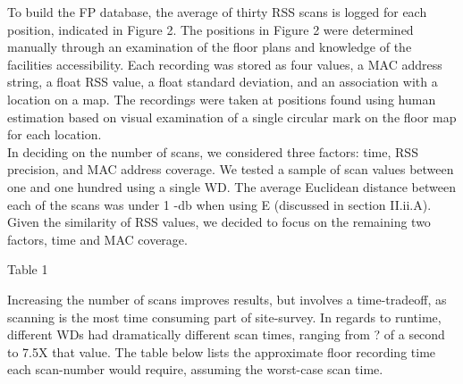 \documentclass[twoside]{article}
\begin{document}
\begin{multicols}{2}
     
\indent To build the FP database, the average of thirty RSS scans is logged for each position, indicated in Figure 2. The positions in Figure 2 were determined manually through an examination of the floor plans and knowledge of the facilities accessibility. Each recording was stored as four values, a MAC address string, a float RSS value, a float standard deviation, and an association with a location on a map. The recordings were taken at positions found using human estimation based on visual examination of a single circular mark on the floor map for each location.\\
\indent In deciding on the number of scans, we considered three factors: time, RSS precision, and MAC address coverage. We tested a sample of scan values between one and one hundred using a single WD. The average Euclidean distance between each of the scans was under 1 -db when using E (discussed in section II.ii.A). Given the similarity of RSS values, we decided to focus on the remaining two factors, time and MAC coverage. 

\vspace{5mm}
\begin{center}
Table 1
\end{center}
	
\indent Increasing the number of scans improves results, but involves a time-tradeoff, as scanning is the most time consuming part of site-survey. In regards to runtime, different WDs had dramatically different scan times, ranging from ? of a second to 7.5X that value. The table below lists the approximate floor recording time each scan-number would require, assuming the worst-case scan time.\\
	

\end{multicols}
\end{document}
